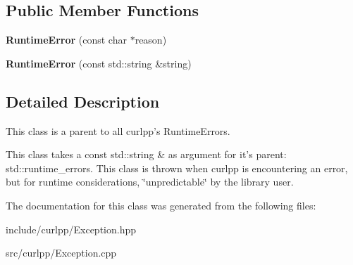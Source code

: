\subsection*{Public Member Functions}
\begin{DoxyCompactItemize}
\item 
\hypertarget{classcurlpp_1_1RuntimeError_a47935a02834b4d8bb136d9815662960b}{{\bfseries Runtime\-Error} (const char $\ast$reason)}\label{classcurlpp_1_1RuntimeError_a47935a02834b4d8bb136d9815662960b}

\item 
\hypertarget{classcurlpp_1_1RuntimeError_a22748fea840c86eae655c767044eb085}{{\bfseries Runtime\-Error} (const std\-::string \&string)}\label{classcurlpp_1_1RuntimeError_a22748fea840c86eae655c767044eb085}

\end{DoxyCompactItemize}


\subsection{Detailed Description}
This class is a parent to all curlpp's Runtime\-Errors. 

This class takes a const std\-::string \& as argument for it's parent\-: std\-::runtime\-\_\-errors. This class is thrown when curlpp is encountering an error, but for runtime considerations, \char`\"{}unpredictable\char`\"{} by the library user. 

The documentation for this class was generated from the following files\-:\begin{DoxyCompactItemize}
\item 
include/curlpp/Exception.\-hpp\item 
src/curlpp/Exception.\-cpp\end{DoxyCompactItemize}

